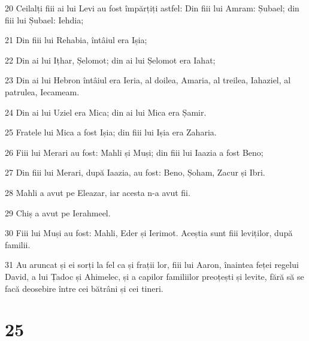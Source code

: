 \par 20 Ceilalți fiii ai lui Levi au fost împărțiți astfel: Din fiii lui Amram: Șubael; din fiii lui Șubael: Iehdia;
\par 21 Din fiii lui Rehabia, întâiul era Ișia;
\par 22 Din ai lui Ițhar, Șelomot; din ai lui Șelomot era Iahat;
\par 23 Din ai lui Hebron întâiul era Ieria, al doilea, Amaria, al treilea, Iahaziel, al patrulea, Iecameam.
\par 24 Din ai lui Uziel era Mica; din ai lui Mica era Șamir.
\par 25 Fratele lui Mica a fost Ișia; din fiii lui Ișia era Zaharia.
\par 26 Fiii lui Merari au fost: Mahli și Muși; din fiii lui Iaazia a fost Beno;
\par 27 Din fiii lui Merari, după Iaazia, au fost: Beno, Șoham, Zacur și Ibri.
\par 28 Mahli a avut pe Eleazar, iar acesta n-a avut fii.
\par 29 Chiș a avut pe Ierahmeel.
\par 30 Fiii lui Muși au fost: Mahli, Eder și Ierimot. Aceștia sunt fiii leviților, după familii.
\par 31 Au aruncat și ei sorți la fel ca și frații lor, fiii lui Aaron, înaintea feței regelui David, a lui Țadoc și Ahimelec, și a capilor familiilor preoțești și levite, fără să se facă deosebire între cei bătrâni și cei tineri.

\chapter{25}

